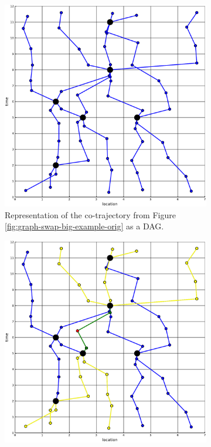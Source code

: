 \documentclass[12pt]{article}
\theoremstyle{definition}
\begin{document}
\begin{figure}
  \centering
  \begin{subfigure}[t]{0.49\textwidth}
    \includegraphics[width=\textwidth]{cotrajectory_example-c.pdf}
    \caption{Representation of the co-trajectory from Figure
      \ref{fig:graph-swap-big-example-orig} as a DAG.}
    \label{fig:graph-swap-big-example-DAG}
  \end{subfigure}
  \begin{subfigure}[t]{0.49\textwidth}
    \includegraphics[width=\textwidth]{cotrajectory_example-d.pdf}

\end{subfigure}
\end{figure}
\end{document}
